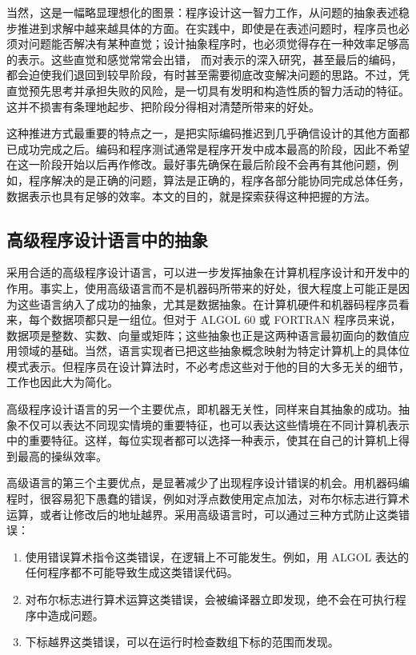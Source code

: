 \documentclass[twoside,11pt,fontset=none]{ctexbook}
\begin{document}
当然，这是一幅略显理想化的图景：程序设计这一智力工作，从问题的抽象表述稳步推进到求解中越来越具体的方面。在实践中，即使是在表述问题时，程序员也必须对问题能否解决有某种直觉；设计抽象程序时，也必须觉得存在一种效率足够高的表示。这些直觉和感觉常常会出错，
而对表示的深入研究，甚至最后的编码，都会迫使我们退回到较早阶段，有时甚至需要彻底改变解决问题的思路。不过，凭直觉预先思考并承担失败的风险，是一切具有发明和构造性质的智力活动的特征。这并不损害有条理地起步、把阶段分得相对清楚所带来的好处。

这种推进方式最重要的特点之一，是把实际编码推迟到几乎确信设计的其他方面都已成功完成之后。编码和程序测试通常是程序开发中成本最高的阶段，因此不希望在这一阶段开始以后再作修改。最好事先确保在最后阶段不会再有其他问题，例如，程序解决的是正确的问题，算法是正确的，程序各部分能协同完成总体任务，数据表示也具有足够的效率。本文的目的，就是探索获得这种把握的方法。

\subsection{高级程序设计语言中的抽象}

采用合适的高级程序设计语言，可以进一步发挥抽象在计算机程序设计和开发中的作用。事实上，使用高级语言而不是机器码所带来的好处，很大程度上可能正是因为这些语言纳入了成功的抽象，尤其是数据抽象。在计算机硬件和机器码程序员看来，每个数据项都只是一组位。但对于 ALGOL 60 或 FORTRAN 程序员来说，数据项是整数、实数、向量或矩阵；这些抽象也正是这两种语言最初面向的数值应用领域的基础。当然，语言实现者已把这些抽象概念映射为特定计算机上的具体位模式表示。但程序员在设计算法时，不必考虑这些对于他的目的大多无关的细节，工作也因此大为简化。

高级程序设计语言的另一个主要优点，即机器无关性，同样来自其抽象的成功。抽象不仅可以表达不同现实情境的重要特征，也可以表达这些情境在不同计算机表示中的重要特征。这样，每位实现者都可以选择一种表示，使其在自己的计算机上得到最高的操纵效率。

高级语言的第三个主要优点，是显著减少了出现程序设计错误的机会。用机器码编程时，很容易犯下愚蠢的错误，例如对浮点数使用定点加法，对布尔标志进行算术运算，或者让修改后的地址越界。采用高级语言时，可以通过三种方式防止这类错误：

\begin{enumerate}[wide, nosep, label=(\arabic*)]
	\item 使用错误算术指令这类错误，在逻辑上不可能发生。例如，用 ALGOL 表达的任何程序都不可能导致生成这类错误代码。
	\item 对布尔标志进行算术运算这类错误，会被编译器立即发现，绝不会在可执行程序中造成问题。
	\item 下标越界这类错误，可以在运行时检查数组下标的范围而发现。
\end{enumerate}
\end{document}
